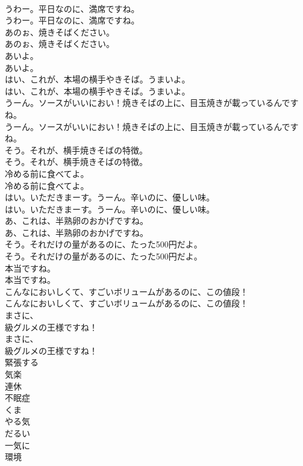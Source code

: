 \documentclass[8pt]{extreport}
\begin{document}
\begin{CJK}{UTF8}{min}
\\	うわー。平日なのに、満席ですね。	
\\	うわー。平日なのに、満席ですね。 
\\	あのぉ、焼きそばください。	
\\	あのぉ、焼きそばください。 
\\	あいよ。	
\\	あいよ。 
\\	はい、これが、本場の横手やきそば。うまいよ。	
\\	はい、これが、本場の横手やきそば。うまいよ。 
\\	うーん。ソースがいいにおい！焼きそばの上に、目玉焼きが載っているんですね。	
\\	うーん。ソースがいいにおい！焼きそばの上に、目玉焼きが載っているんですね。 
\\	そう。それが、横手焼きそばの特徴。	
\\	そう。それが、横手焼きそばの特徴。 
\\	冷める前に食べてよ。	
\\	冷める前に食べてよ。 
\\	はい。いただきまーす。うーん。辛いのに、優しい味。	
\\	はい。いただきまーす。うーん。辛いのに、優しい味。 
\\	あ、これは、半熟卵のおかげですね。	
\\	あ、これは、半熟卵のおかげですね。 
\\	そう。それだけの量があるのに、たった500円だよ。	
\\	そう。それだけの量があるのに、たった500円だよ。 
\\	本当ですね。	
\\	本当ですね。 
\\	こんなにおいしくて、すごいボリュームがあるのに、この値段！	
\\	こんなにおいしくて、すごいボリュームがあるのに、この値段！ 
\\	まさに、
\\	級グルメの王様ですね！	
\\	まさに、
\\	級グルメの王様ですね！ 
\\	緊張する
\\	気楽
\\	連休
\\	不眠症
\\	くま
\\	やる気
\\	だるい
\\	一気に
\\	環境

\end{CJK}
\end{document}
